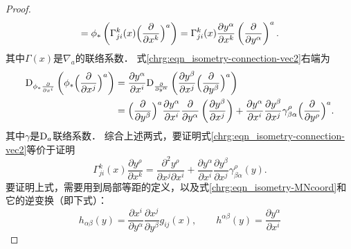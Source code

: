 \begin{proof}
\begin{equation*}
        =\phi_{*}\left( \Gamma^{k}_{ji}(x) \Bigl(\frac{\partial} {\partial x^k}\Bigr)^a\right)
        =\Gamma^{k}_{ji}(x) \frac{\partial y^\alpha}{\partial x^k}
         \left( \frac{\partial }{\partial y^\alpha}\right)^a .
    \end{equation*}
    其中$\Gamma(x)$是$\nabla_a$的联络系数．
    式\eqref{chrg:eqn_isometry-connection-vec2}右端为
    \begin{align*}
        {\rm D}_ {\phi_* \frac{\partial}{\partial x^i}} \left({\phi_*}\Bigl(\frac{\partial}
        {\partial x^j}\Bigr)^a \right) &= \frac{\partial y^\alpha}{\partial x^i}
         {\rm D}_{\frac{\partial}{\partial y^\alpha}}
         \left( \frac{\partial y^\beta}{\partial x^j}
          \Bigl(\frac{\partial}{\partial y^\beta}\Bigr)^a\right)\\
        &=\Bigl(\frac{\partial}{\partial y^\beta}\Bigr)^a
        \frac{\partial y^\alpha}{\partial x^i} {\frac{\partial}{\partial y^\alpha}}
        \left( \frac{\partial y^\beta}{\partial x^j} \right) +
        \frac{\partial y^\alpha}{\partial x^i} \frac{\partial y^\beta}{\partial x^j}
        \gamma^{\rho}_{\beta\alpha} \Bigl(\frac{\partial}{\partial y^\rho}\Bigr)^a .
    \end{align*}
    其中$\gamma$是${\rm D}_a$联络系数．
    综合上述两式，要证明式\eqref{chrg:eqn_isometry-connection-vec2}等价于证明
    \begin{equation}\label{chrg:eqn_isometry-connection-tmp}
       \Gamma^{k}_{ji}(x) \frac{\partial y^\rho}{\partial x^k} =
         \frac{\partial^2 y^\rho}{\partial x^j \partial x^i}+
         \frac{\partial y^\alpha}{\partial x^i}
         \frac{\partial y^\beta}{\partial x^j}
         \gamma^{\rho}_{\beta\alpha}(y) .
    \end{equation}
    要证明上式，需要用到局部等距的定义，以及式\eqref{chrg:eqn_isometry-MNcoord}和它的逆变换（即下式）：
    \begin{equation}
       h_{\alpha\beta}(y) =\frac{\partial x^i}{\partial y^\alpha}
        \frac{\partial x^j}{\partial y^\beta} g_{ij}(x), \qquad
       h^{\alpha\beta}(y)=\frac{\partial y^\alpha}{\partial x^i}

\end{equation}
\end{proof}
